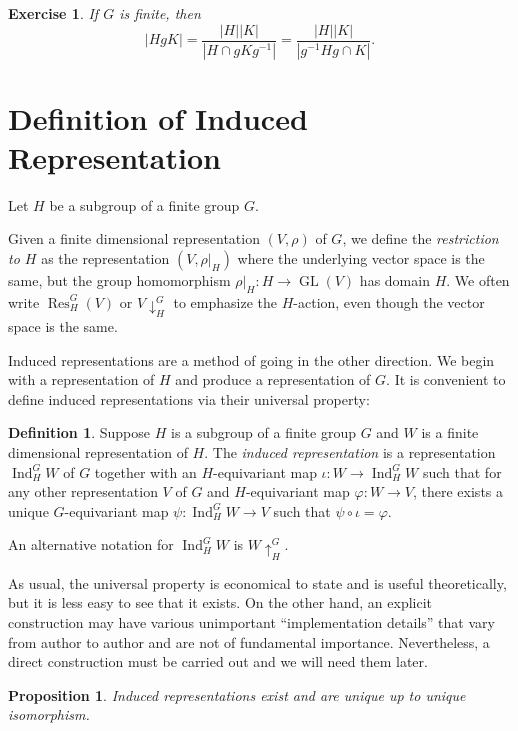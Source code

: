 \documentclass[12pt]{article}
\theoremstyle{plain}
\newtheorem{proposition}[theorem]{Proposition}
\newtheorem{exercise}[theorem]{Exercise}
\theoremstyle{definition}
\newtheorem{definition}[theorem]{Definition}
\theoremstyle{remark}
\numberwithin{equation}{section}
\begin{document}
\begin{exercise}
If $G$ is finite, then
\[
|HgK| = \frac{|H| |K|}{|H \cap g K g^{-1}|}=
\frac{|H| |K|}{|g^{-1}Hg \cap K|}.
\]
\end{exercise}

\section{Definition of Induced Representation}

Let $H$ be a subgroup of a finite group $G$.

Given a finite dimensional
representation $(V,\rho)$ of $G$, we define the \emph{restriction to
$H$} as the representation $(V,\rho|_H)$ where the underlying vector
space is the same, but the group homomorphism $\rho|_H : H \to
\operatorname{GL}(V)$ has domain $H$.
We often write $\operatorname{Res}_H^G(V)$ or $V {\downarrow}^G_H$
to emphasize the $H$-action, even though the vector space is the same.

Induced representations are a method of going in the other direction.
We begin with a representation of $H$ and produce a representation of
$G$.
It is convenient to define induced representations via their universal
property:

\begin{definition}
Suppose $H$ is a subgroup of a finite group $G$ and
$W$ is a finite dimensional representation of $H$. 
The \emph{induced representation} is a representation
$\operatorname{Ind}_H^G W$ of $G$ together with an
$H$-equivariant map $\iota : W \to \operatorname{Ind}_H^G W$ such that
for any other representation $V$ of $G$ and $H$-equivariant map
$\varphi : W \to V$, there exists a unique $G$-equivariant map
$\psi: \operatorname{Ind}_H^G W \to V$ such that
$\psi \circ \iota = \varphi$.
\end{definition}

An alternative notation for $\operatorname{Ind}_H^G W$ is $W
{\uparrow}_H^G$.

As usual, the universal property is economical to state and is useful
theoretically, but it is less easy to see that it exists.
On the other hand, an explicit construction may have various
unimportant ``implementation details'' that vary from author to author
and are not of fundamental importance.
Nevertheless, a direct construction must be carried out and we
will need them later.

\begin{proposition} \label{prop:ind_construction}
Induced representations exist and are unique up to unique isomorphism.
\end{proposition}
\end{document}

